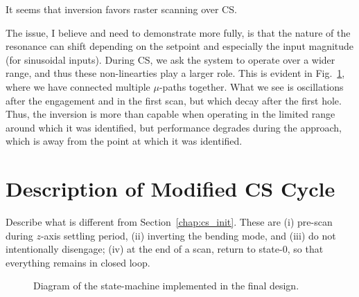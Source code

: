 \documentclass[11pt]{article}
\begin{document}
It seems that inversion favors raster scanning over CS.

The issue, I believe and need to demonstrate more fully, is that the nature of the resonance can shift depending on the setpoint and especially the input magnitude (for sinusoidal inputs). During CS, we ask the system to operate over a wider range, and thus these non-linearties play a larger role. This is evident in Fig.~\ref{fig:dinv_CS_decay}, where we have connected multiple $\mu$-paths together. What we see is oscillations after the engagement and in the first scan, but which decay after the first hole. Thus, the inversion is more than capable when operating in the limited range around which it was identified, but performance degrades during the approach, which is away from the point at which it was identified.


\begin{figure}
  \centering
  
  \caption{}
  \label{fig:dinv_CS_decay}
\end{figure}

\section{Description of Modified CS Cycle}\label{sec:modfied_cs_cycle}
Describe what is different from Section~\ref{chap:cs_init}. These are (i) pre-scan during $z$-axis settling period, (ii) inverting the bending mode, and (iii) do not intentionally disengage; (iv) at the end of a scan, return to state-0, so that everything remains in closed loop.
\begin{figure}
  \centering
    
    \caption{Diagram of the state-machine implemented in the final design.}
    \label{fig:sm_final}
\end{figure}
\end{document}
